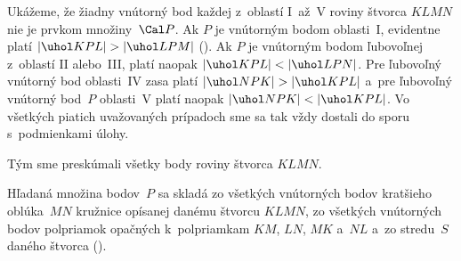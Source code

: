 {Ukážeme, že žiadny vnútorný bod každej z~oblastí I~až~V roviny štvorca
$KLMN$ nie je prvkom množiny~$\Cal P$. Ak $P$ je vnútorným bodom
oblasti~I, evidentne platí $|\uhol KPL|>|\uhol LPM|$ ().
Ak $P$ je vnútorným bodom ľubovoľnej z~oblastí II alebo~III, platí
naopak $|\uhol KPL|<|\uhol LPN|$. Pre ľubovoľný vnútorný bod
oblasti~IV zasa platí $|\uhol NPK|>|\uhol KPL|$ a~pre ľubovoľný
vnútorný bod~$P$ oblasti~V platí naopak $|\uhol NPK|<|\uhol
KPL|$. Vo všetkých piatich uvažovaných prípadoch sme sa tak vždy
dostali do sporu s~podmienkami úlohy.

Tým sme preskúmali všetky body roviny štvorca $KLMN$.


\zaver
Hľadaná množina bodov~$P$ sa skladá zo všetkých
vnútorných bodov kratšieho oblúka~$MN$ kružnice opísanej danému
štvorcu $KLMN$, zo všetkých vnútorných bodov polpriamok opačných
k~polpriamkam $KM$, $LN$, $MK$ a~$NL$ a~zo stredu~$S$ daného
štvorca (\obr).
\inspicture{}}

